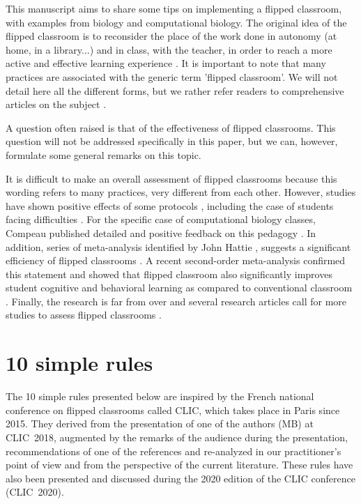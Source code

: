 \documentclass[10pt,letterpaper]{article}
\begin{document}
This manuscript aims to share some tips on implementing a flipped classroom, with examples from biology and computational biology. 
The original idea of the flipped classroom is to reconsider the place of the work done in autonomy (at home, in a library...) and in class, with the teacher, in order 
to reach a more active and effective learning experience \cite{bergmann_flip_2012,schell_flipping_2015}. 
It is important to note that many practices are associated with the generic term 'flipped classroom'.
We will not detail here all the different forms, but we rather refer readers to comprehensive articles on the subject
\cite{bishop_flipped_2013,lebrun_vers_2016}.

A question often raised is that of the effectiveness of flipped classrooms. This question will not be addressed specifically in this paper, but we can, however, formulate some general remarks on this topic.

It is difficult to make an overall assessment of flipped classrooms because this wording refers to many
practices, very different from each other. However, studies have shown positive effects of some protocols
\cite{casasola_can_2017, crouch_peer_2001, freeman_reply_2014}, including the case of students facing
difficulties \cite{lage_inverting_2000}. For the specific case of computational biology classes, 
Compeau published detailed and positive feedback on this pedagogy \cite{compeau_establishing_2019}.
In addition, series of meta-analysis identified by John Hattie \cite{hattie2014, hattie2018}, suggests a significant efficiency of flipped classrooms
\cite{chen_academic_2019,hew_flipped_2018,karagol_effect_2019,tan_effectiveness_2017}. 
A recent second-order meta-analysis confirmed this statement and showed that flipped classroom also
significantly improves student cognitive and behavioral learning as compared to conventional 
classroom \cite{hew_does_2020}.
Finally, the research is far from over and several research articles call for more studies to assess
flipped classrooms 
\cite{abeysekera_motivation_2015,bishop_flipped_2013,hew_does_2020,lo_critical_2017}.


\section{10 simple rules}

The 10 simple rules presented below are inspired by the French national conference on flipped classrooms called CLIC, which takes place 
in Paris since 2015. They derived from the presentation of one of the authors (MB) at CLIC~2018, augmented by the remarks 
of the audience during the presentation, recommendations of one of the references \cite{lo_critical_2017} and re-analyzed in our practitioner's point of view and from the perspective of the current literature.
These rules have also been presented and discussed during the 2020 edition of the CLIC conference (CLIC~2020).
\end{document}
